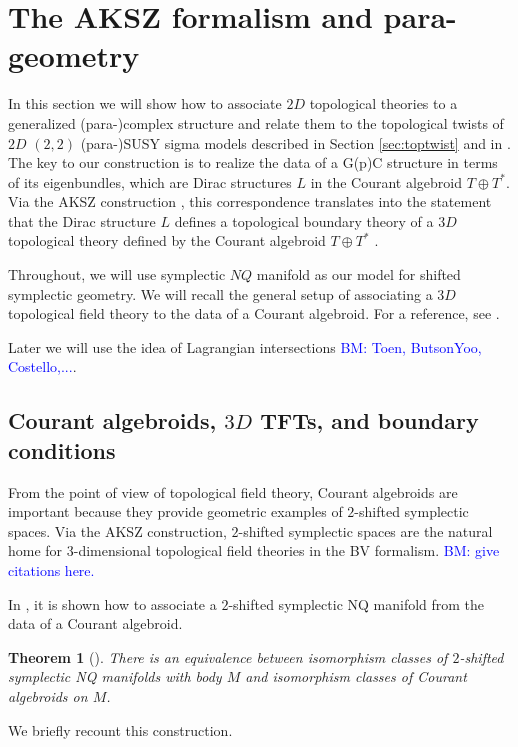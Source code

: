 \documentclass{article}
\newcommand{\TT}{{T\oplus T^*}}
\def\fg{\mathfrak{g}}
\newtheorem{theorem}{Theorem}[section]
\theoremstyle{definition}
\theoremstyle{remark}
\def\brian{\textcolor{blue}{BM: }\textcolor{blue}}
\begin{document}
 

\section{The AKSZ formalism and para-geometry}
\def\fg{\mathfrak{g}}
In this section we will show how to associate $2D$ topological theories to a generalized (para-)complex structure and relate them to the topological twists of $2D$ $(2,2)$ (para-)SUSY sigma models described in Section \ref{sec:toptwist} and in \cite{Kapustin:2004gv}. 
The key to our construction is to realize the data of a G(p)C structure in terms of its eigenbundles, which are Dirac structures $L$ in the Courant algebroid $\TT$. 
Via the AKSZ construction \cite{AKSZ}, this correspondence translates into the statement that the Dirac structure $L$ defines a topological boundary theory of a $3D$ topological theory defined by the Courant algebroid $\TT$ \cite{Roytenberg:2002nu}.

Throughout, we will use symplectic $NQ$ manifold as our model for shifted symplectic geometry. 
We will recall the general setup of associating a $3D$ topological field theory to the data of a Courant algebroid. 
For a reference, see \cite{Roytenberg:2002nu,??}.

Later we will use the idea of Lagrangian intersections \brian{Toen, ButsonYoo, Costello,...}. 
\subsection{Courant algebroids, $3D$ TFTs, and boundary conditions}
From the point of view of topological field theory, Courant algebroids are important because they provide geometric examples of $2$-shifted symplectic spaces. 
Via the AKSZ construction, $2$-shifted symplectic spaces are the natural home for $3$-dimensional topological field theories in the BV formalism. 
\brian{give citations here.}

In \cite{Roytenberg:2002nu}, it is shown how to associate a $2$-shifted symplectic NQ manifold from the data of a Courant algebroid. 

\begin{theorem}[\cite{Roytenberg:2002nu}]
There is an equivalence between isomorphism classes of $2$-shifted symplectic NQ manifolds with body $M$ and isomorphism classes of Courant algebroids on $M$.
\end{theorem}

We briefly recount this construction. 


\def\Sym{{\rm Sym}}
\end{document}
